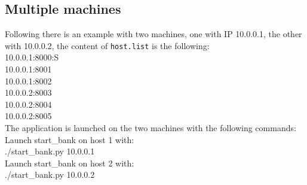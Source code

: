 \documentclass{article}
\begin{document}
        \subsection{Multiple machines}
        Following there is an example with two machines, one with IP 10.0.0.1, the other with 10.0.0.2, the content of \texttt{host.list} is the following:\\
        10.0.0.1:8000:S\\
        10.0.0.1:8001\\
        10.0.0.1:8002\\
        10.0.0.2:8003\\
        10.0.0.2:8004\\
        10.0.0.2:8005\\
        The application is launched on the two machines with the following commands:\\
        Launch start\_bank on host 1 with:\\
        ./start\_bank.py 10.0.0.1\\
        Launch start\_bank on host 2 with:\\
        ./start\_bank.py 10.0.0.2
\end{document}
